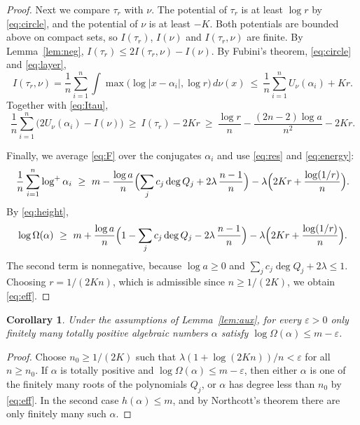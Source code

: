 \documentclass[11pt]{amsart}
\newtheorem{corollary}[theorem]{Corollary}
\theoremstyle{remark}
\numberwithin{equation}{section}
\newcommand{\logp}{\log^{+}}
\begin{document}
\begin{proof}
Next we compare $\tau_r$ with $\nu$. The potential of $\tau_r$ is at least $\log r$ by \eqref{eq:circle}, and the potential of $\nu$ is at least $-K$. Both potentials are bounded above on compact sets, so $I(\tau_r)$, $I(\nu)$ and $I(\tau_r,\nu)$ are finite. By Lemma~\ref{lem:neg}, $I(\tau_r)\le2I(\tau_r,\nu)-I(\nu)$. By Fubini's theorem, \eqref{eq:circle} and \eqref{eq:layer},
\[
I(\tau_r,\nu)=\frac1n\sum_{i=1}^n\int\max\bigl(\log|x-\alpha_i|,\log r\bigr)\,d\nu(x)\ \le\ \frac1n\sum_{i=1}^nU_\nu(\alpha_i)+Kr.
\]
Together with \eqref{eq:Itau},
\begin{equation}\label{eq:energy}
\frac1n\sum_{i=1}^n\bigl(2U_\nu(\alpha_i)-I(\nu)\bigr)\ \ge\ I(\tau_r)-2Kr\ \ge\ \frac{\log r}n-\frac{(2n-2)\log a}{n^2}-2Kr.
\end{equation}

Finally, we average \eqref{eq:F} over the conjugates $\alpha_i$ and use \eqref{eq:res} and \eqref{eq:energy}:
\[
\frac1n\sum_{i=1}^n\logp\alpha_i\ \ge\ m-\frac{\log a}n\Bigl(\sum_jc_j\deg Q_j+2\lambda\,\frac{n-1}n\Bigr)-\lambda\Bigl(2Kr+\frac{\log(1/r)}n\Bigr).
\]
By \eqref{eq:height},
\[
\log\Omega(\alpha)\ \ge\ m+\frac{\log a}n\Bigl(1-\sum_jc_j\deg Q_j-2\lambda\,\frac{n-1}n\Bigr)-\lambda\Bigl(2Kr+\frac{\log(1/r)}n\Bigr).
\]
The second term is nonnegative, because $\log a\ge0$ and $\sum_jc_j\deg Q_j+2\lambda\le1$. Choosing $r=1/(2Kn)$, which is admissible since $n\ge1/(2K)$, we obtain \eqref{eq:eff}.
\end{proof}

\begin{corollary}\label{cor:fin}
Under the assumptions of Lemma~\ref{lem:aux}, for every $\varepsilon>0$ only finitely many totally positive algebraic numbers $\alpha$ satisfy $\log\Omega(\alpha)\le m-\varepsilon$.
\end{corollary}

\begin{proof}
Choose $n_0\ge1/(2K)$ such that $\lambda(1+\log(2Kn))/n<\varepsilon$ for all $n\ge n_0$. If $\alpha$ is totally positive and $\log\Omega(\alpha)\le m-\varepsilon$, then either $\alpha$ is one of the finitely many roots of the polynomials $Q_j$, or $\alpha$ has degree less than $n_0$ by \eqref{eq:eff}. In the second case $h(\alpha)\le m$, and by Northcott's theorem \cite[Theorem~1.6.8]{BG06} there are only finitely many such $\alpha$.
\end{proof}
\end{document}
